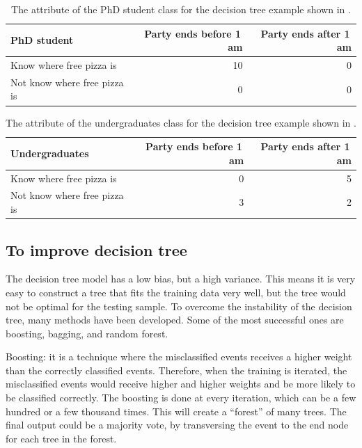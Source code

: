 \begin{table}[!tbp]\centering

\begin{tabular}{lrr}
\hline \hline
PhD student & Party ends before 1\,am  & Party ends after 1\,am\\
\hline
Know where free pizza is & 10 & 0 \\
Not know where free pizza is & 0 & 0 \\
\hline \hline
\end{tabular}
\caption
{The attribute of the PhD student class for the decision tree example shown in .}
\label{tab:doubleHiggsDecisionTreeComic}
\end{table}
\begin{table}[!tbp]\centering

\begin{tabular}{lrr}
\hline \hline
Undergraduates & Party ends before 1\,am  & Party ends after 1\,am\\
\hline
Know where free pizza is & 0 & 5 \\
Not know where free pizza is & 3 & 2 \\
\hline \hline
\end{tabular}
\caption
{The attribute of  the undergraduates class for the decision tree example shown in .}
\label{tab:doubleHiggsDecisionTreeComic2}
\end{table}


\subsection{To improve decision tree}

The decision tree model has a low bias, but a high variance. This means it is very easy to construct a tree that fits the training data very well, but the tree would not be optimal for the testing sample. To overcome the instability of the decision tree, many methods have been developed. Some of the most successful ones are boosting, bagging, and random forest.

Boosting: it is a technique where the misclassified events receives a higher weight than the correctly classified events. Therefore, when the training is iterated, the misclassified events would receive higher and higher weights and be more likely to be classified correctly. The boosting is done at every iteration, which can be a few hundred or a few thousand times. This will create a ``forest'' of many trees. The final output could be a majority vote, by transversing the event to the end node for each tree in the forest.

